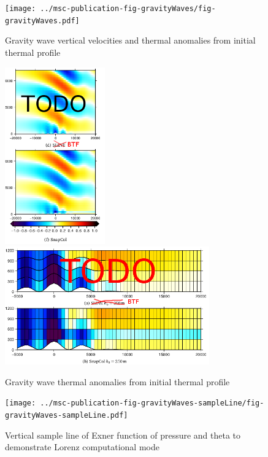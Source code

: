 \documentclass[twocol]{ametsoc}
\begin{document}
\begin{figure}
	\centering
	\texttt{[image: ../msc-publication-fig-gravityWaves/fig-gravityWaves.pdf]}
%
	\caption{Gravity wave vertical velocities and thermal anomalies from initial thermal profile}
	\label{fig:gw-w}
\end{figure}

\begin{figure}
	\includegraphics[height=3in]{gw-theta.png}
	\includegraphics[height=2in]{gw-theta-zoom.png}
%
	\caption{Gravity wave thermal anomalies from initial thermal profile}
	\label{fig:gw-theta}
\end{figure}

\begin{figure}
	\centering
	\texttt{[image: ../msc-publication-fig-gravityWaves-sampleLine/fig-gravityWaves-sampleLine.pdf]}
%
	\caption{Vertical sample line of Exner function of pressure and theta to demonstrate Lorenz computational mode}
	\label{fig:gw-exner-theta}
\end{figure}
\end{document}
